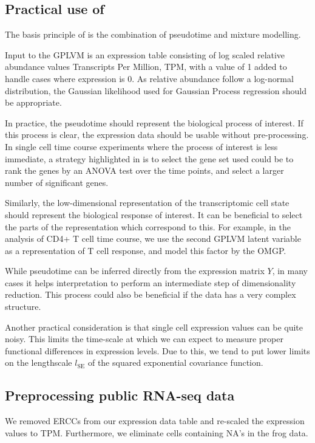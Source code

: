 \subsection{Practical use of }

The basis principle of  is the combination of pseudotime and mixture modelling.

Input to the GPLVM is an expression table consisting of log scaled relative abundance values Transcripts Per Million, TPM, with a value of 1 added to handle cases where expression is 0. As relative abundance follow a log-normal distribution, the Gaussian likelihood used for Gaussian Process regression should be appropriate.

In practice, the pseudotime should represent the biological process of interest. If this process is clear, the expression data should be usable without pre-processing. In single cell time course experiments where the process of interest is less immediate, a strategy highlighted in \cite{Trapnell2014-cn} is to select the gene set used could be to rank the genes by an ANOVA test over the time points, and select a larger number of significant genes.

Similarly, the low-dimensional representation of the transcriptomic cell state should represent the biological response of interest. It can be beneficial to select the parts of the representation which correspond to this. For example, in the analysis of CD4+ T cell time course, we use the second GPLVM latent variable as a representation of T cell response, and model this factor by the OMGP.

While pseudotime can be inferred directly from the expression matrix $ Y $, in many cases it helps interpretation to perform an intermediate step of dimensionality reduction. This process could also be beneficial if the data has a very complex structure.

Another practical consideration is that single cell expression values can be quite noisy. This limits the time-scale at which we can expect to measure proper functional differences in expression levels. Due to this, we tend to put lower limits on the lengthscale $ l_\text{SE} $ of the squared exponential covariance function.

\subsection{Preprocessing public RNA-seq data}

We removed ERCCs from our expression data table and re-scaled the expression values to TPM. Furthermore, we eliminate cells containing NA's in the frog data.

